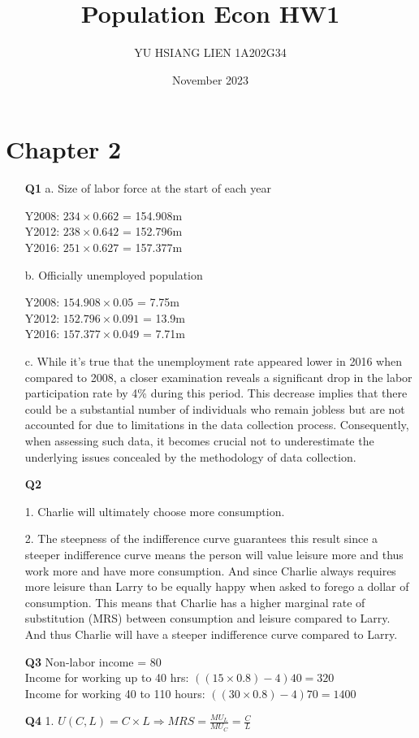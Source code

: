 \documentclass[12pt]{article}
\title{Population Econ HW1}
\author{YU HSIANG LIEN 1A202G34}
\date{November 2023}
\begin{document}
\maketitle

\section{Chapter 2}
\begin{enumerate}
    \item[\textbf{Q1}] 
    a. Size of labor force at the start of each year
    
    Y2008: $234 \times 0.662$ = 154.908m\\
    Y2012: $238 \times 0.642$ = 152.796m\\
    Y2016: $251 \times 0.627$ = 157.377m

    b. Officially unemployed population
    
    Y2008: $154.908 \times 0.05$ = 7.75m\\
    Y2012: $152.796 \times 0.091$ = 13.9m\\
    Y2016: $157.377 \times 0.049$ = 7.71m

    c. While it's true that the unemployment rate appeared lower in 2016 when compared to 2008, a closer examination reveals a significant drop in the labor participation rate by 4\% during this period. This decrease implies that there could be a substantial number of individuals who remain jobless but are not accounted for due to limitations in the data collection process. Consequently, when assessing such data, it becomes crucial not to underestimate the underlying issues concealed by the methodology of data collection.
    
    \item[\textbf{Q2}] 
    
    1. Charlie will ultimately choose more consumption.
       
    2. The steepness of the indifference curve guarantees this result since a steeper indifference curve means the person will value leisure more and thus work more and have more consumption. And since Charlie always requires more leisure than Larry to be equally happy when asked to forego a dollar of consumption. This means that Charlie has a higher marginal rate of substitution (MRS) between consumption and leisure compared to Larry. And thus Charlie will have a steeper indifference curve compared to Larry.

    \item[\textbf{Q3}] 
    Non-labor income = 80\\
    Income for working up to 40 hrs: $((15 \times 0.8)-4)40 = 320$\\
    Income for working 40 to 110 hours: $((30 \times 0.8)-4)70 = 1400$
    \item[\textbf{Q4}] 
    1. $U(C,L) = C \times L \Rightarrow MRS = \frac{MU_L}{MU_C} = \frac{C}{L}$ 
    

\end{enumerate}
\end{document}
